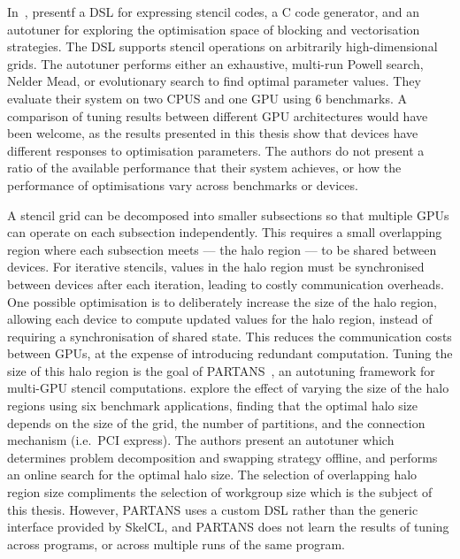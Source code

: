 In~\cite{Christen2011}, \citeauthor{Christen2011} presentf a DSL for
expressing stencil codes, a C code generator, and an autotuner for
exploring the optimisation space of blocking and vectorisation
strategies. The DSL supports stencil operations on arbitrarily
high-dimensional grids. The autotuner performs either an exhaustive,
multi-run Powell search, Nelder Mead, or evolutionary search to find
optimal parameter values. They evaluate their system on two CPUS and
one GPU using 6 benchmarks. A comparison of tuning results between
different GPU architectures would have been welcome, as the results
presented in this thesis show that devices have different responses to
optimisation parameters. The authors do not present a ratio of the
available performance that their system achieves, or how the
performance of optimisations vary across benchmarks or devices.

A stencil grid can be decomposed into smaller subsections so that
multiple GPUs can operate on each subsection independently. This
requires a small overlapping region where each subsection meets ---
the halo region --- to be shared between devices. For iterative
stencils, values in the halo region must be synchronised between
devices after each iteration, leading to costly communication
overheads. One possible optimisation is to deliberately increase the
size of the halo region, allowing each device to compute updated
values for the halo region, instead of requiring a synchronisation of
shared state. This reduces the communication costs between GPUs, at
the expense of introducing redundant computation. Tuning the size of
this halo region is the goal of PARTANS~\cite{Lutz2013}, an autotuning
framework for multi-GPU stencil computations. \citeauthor{Lutz2013}
explore the effect of varying the size of the halo regions using six
benchmark applications, finding that the optimal halo size depends on
the size of the grid, the number of partitions, and the connection
mechanism (i.e.\ PCI express). The authors present an autotuner which
determines problem decomposition and swapping strategy offline, and
performs an online search for the optimal halo size. The selection of
overlapping halo region size compliments the selection of workgroup
size which is the subject of this thesis. However, PARTANS uses a
custom DSL rather than the generic interface provided by SkelCL, and
PARTANS does not learn the results of tuning across programs, or
across multiple runs of the same program.


